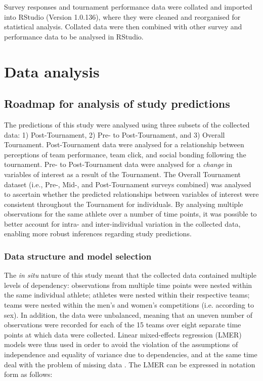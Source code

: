 \begin{CJK}{UTF8}{gbsn}
Survey responses and tournament performance data were collated and imported into RStudio (Version 1.0.136), where they were cleaned and reorganised for statistical analysis. Collated data were then combined with other survey and performance data to be analysed in RStudio.






\clearpage
\section{Data analysis}

\subsection{Roadmap for analysis of study predictions}
The predictions of this study were analysed using three subsets of the collected data: 1) Post-Tournament, 2) Pre- to Post-Tournament, and 3) Overall Tournament.  Post-Tournament data were analysed for a relationship between perceptions of team performance, team click, and social bonding following the tournament.  Pre- to Post-Tournament data were analysed for a \textit{change} in variables of interest as a result of the Tournament.  The Overall Tournament dataset (i.e., Pre-, Mid-, and Post-Tournament surveys combined) was analysed to ascertain whether the predicted relationships between variables of interest were consistent throughout the Tournament for individuals.  By analysing multiple observations for the same athlete over a number of time points, it was possible to better account for intra- and inter-individual variation in the collected data, enabling more robust inferences regarding study predictions.

\subsubsection{Data structure and model selection\label{survey:dataStructureModelSelection}}
The \textit{in situ} nature of this study meant that the collected data contained multiple levels of dependency: observations from multiple time points were nested within the same individual athlete; athletes were nested within their respective teams; teams were nested within the men's and women's competitions (i.e. according to sex).  In addition, the data were unbalanced, meaning that an uneven number of observations were recorded for each of the 15 teams over eight separate time points at which data were collected.  Linear mixed-effects regression (LMER) models were thus used in order to avoid the violation of the assumptions of independence and equality of variance due to dependencies, and at the same time deal with the problem of missing data \citep{Quene2004,Field2012}.  The LMER can be expressed in notation form as follows:


\end{CJK}
